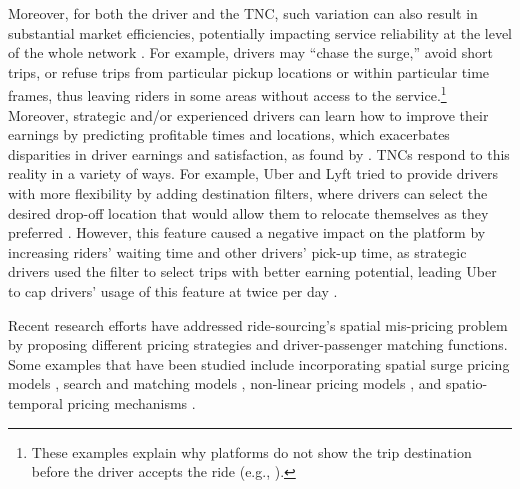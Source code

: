 \documentclass[a4paper, 11pt]{article}
\begin{document}
Moreover, for both the driver and the TNC, such variation can also result in substantial market efficiencies, potentially impacting service reliability at the level of the whole network \citep{ma-2018}.  For example, drivers may ``chase the surge,'' avoid short trips, or refuse trips from particular pickup locations or within particular time frames, thus leaving riders in some areas without access to the service.\footnote{These examples explain why platforms do not show the trip destination before the driver accepts the ride (e.g., \cite{ignorance, short}).}  Moreover, strategic and/or experienced drivers can learn how to improve their earnings by predicting profitable times and locations, which exacerbates disparities in driver earnings and satisfaction, as found by \citet{gender}. 
TNCs respond to this reality in a variety of ways.  For example, Uber and Lyft tried to provide drivers with more flexibility by adding destination filters, where drivers can select the desired drop-off location that would allow them to relocate themselves as they preferred \citep{filter1, lyft}. However, this feature caused a negative impact on the platform by increasing riders' waiting time and other drivers' pick-up time, as strategic drivers used the filter to select trips with better earning potential, leading Uber to cap drivers' usage of this feature at twice per day \citep{filter2}. 

Recent research efforts have addressed ride-sourcing's spatial mis-pricing problem by proposing different pricing strategies and driver-passenger matching functions. Some examples that have been studied include incorporating spatial surge pricing models \citep{spatial3, spatial2}, search and matching models \citep{friction8, spatial4, spatial5, spatial15}, non-linear pricing models \citep{friction9}, and spatio-temporal pricing mechanisms \citep{ma-2018}. 

\end{document}
